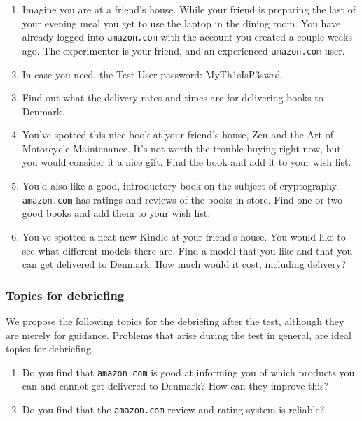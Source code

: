 \begin{enumerate}

\item Imagine you are at a friend's house. While your friend is preparing the
last of your evening meal you get to use the laptop in the dining room. You
have already logged into \texttt{amazon.com} with the account you created a
couple weeks ago. The experimenter is your friend, and an experienced
\texttt{amazon.com} user.

\item In case you need, the Test User password: MyTh1sIsP3swrd.

\item Find out what the delivery rates and times are for delivering books to
Denmark.

\item You've spotted this nice book at your friend's house, Zen and the Art of
Motorcycle Maintenance. It's not worth the trouble buying right now, but you
would consider it a nice gift. Find the book and add it to your wish list.

\item You'd also like a good, introductory book on the subject of cryptography.
\texttt{amazon.com} has ratings and reviews of the books in store. Find one or
two good books and add them to your wish list.

\item You've spotted a neat new Kindle at your friend's house. You would like
to see what different models there are. Find a model that you like and that you
can get delivered to Denmark. How much would it cost, including delivery?

\end{enumerate}

\subsubsection{Topics for debriefing}

We propose the following topics for the debriefing after the test, although
they are merely for guidance. Problems that arise during the test in general,
are ideal topics for debriefing.

\begin{enumerate}

\item Do you find that \texttt{amazon.com} is good at informing you of which
products you can and cannot get delivered to Denmark? How can they improve
this?

\item Do you find that the \texttt{amazon.com} review and rating system is
reliable?

\end{enumerate}

